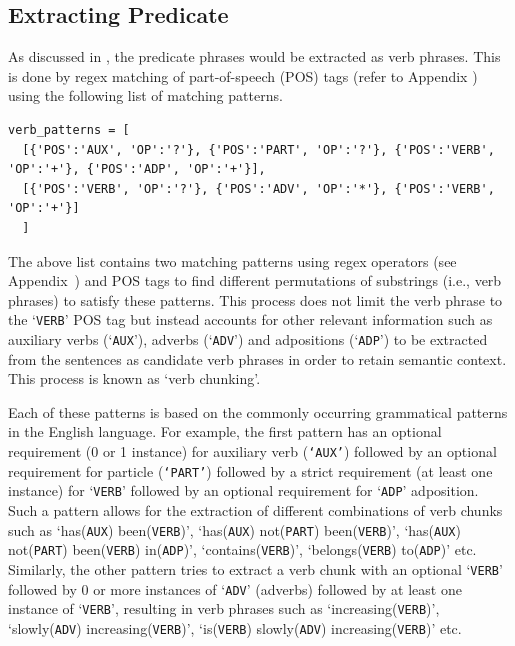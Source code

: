 \subsection{Extracting Predicate}

As discussed in , the predicate phrases would be extracted as verb phrases. This is done by regex matching of part-of-speech (POS) tags (refer to Appendix ) using the following list of matching patterns. 

\begin{verbatim}
verb_patterns = [
  [{'POS':'AUX', 'OP':'?'}, {'POS':'PART', 'OP':'?'}, {'POS':'VERB', 'OP':'+'}, {'POS':'ADP', 'OP':'+'}],
  [{'POS':'VERB', 'OP':'?'}, {'POS':'ADV', 'OP':'*'}, {'POS':'VERB', 'OP':'+'}]
  ]
\end{verbatim}

The above list contains two matching patterns using regex operators (see Appendix~) and POS tags to find different permutations of substrings (i.e., verb phrases) to satisfy these patterns. This process does not limit the verb phrase to the `\texttt{VERB}' POS tag but instead accounts for other relevant information such as auxiliary verbs (`\texttt{AUX}'), adverbs (`\texttt{ADV}') and adpositions (`\texttt{ADP}') to be extracted from the sentences as candidate verb phrases in order to retain semantic context. This process is known as `verb chunking'. 

Each of these patterns is based on the commonly occurring grammatical patterns in the English language. For example, the first pattern has an optional requirement (0 or 1 instance) for auxiliary verb (\texttt{`AUX'}) followed by an optional requirement for particle (\texttt{`PART'}) followed by a strict requirement (at least one instance) for `\texttt{VERB}' followed by an optional requirement for `\texttt{ADP}' adposition. Such a pattern allows for the extraction of different combinations of verb chunks such as `has(\texttt{AUX}) been(\texttt{VERB})', `has(\texttt{AUX}) not(\texttt{PART}) been(\texttt{VERB})', `has(\texttt{AUX}) not(\texttt{PART}) been(\texttt{VERB}) in(\texttt{ADP})', `contains(\texttt{VERB})', `belongs(\texttt{VERB}) to(\texttt{ADP})' etc. Similarly, the other pattern tries to extract a verb chunk with an optional `\texttt{VERB}' followed by 0 or more instances of `\texttt{ADV}' (adverbs) followed by at least one instance of `\texttt{VERB}', resulting in verb phrases such as `increasing(\texttt{VERB})', `slowly(\texttt{ADV}) increasing(\texttt{VERB})', `is(\texttt{VERB}) slowly(\texttt{ADV}) increasing(\texttt{VERB})' etc. 

